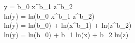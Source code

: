 
y = b_0 \cdot x^{b_1} \cdot z^{b_2} \\

ln(y) = ln(b_0 \cdot x^{b_1} \cdot z^{b_2}) \\

ln(y) = ln(b_0) + ln(x^{b_1}) + ln(z^{b_2}) \\

ln(y) = ln(b_0) + b_1 \cdot ln(x) + b_2 \cdot ln(z)
